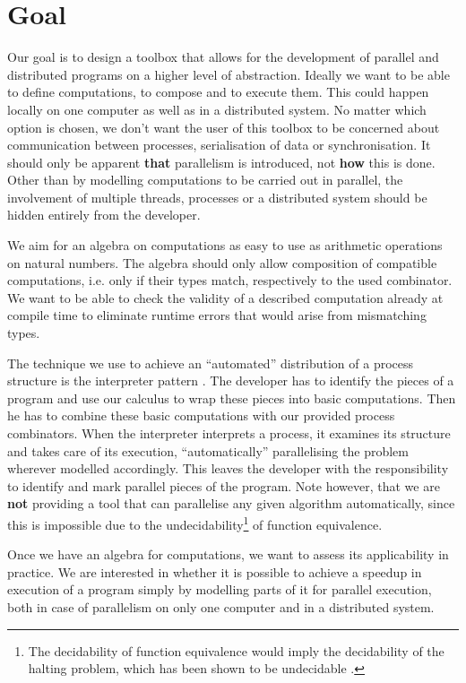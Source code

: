 \section{Goal}
\label{chp:goal}
Our goal is to design a toolbox that allows for the development of parallel and distributed programs on a higher level of abstraction. Ideally we want to be able to define computations, to compose and to execute them. This could happen locally on one computer as well as in a distributed system. No matter which option is chosen, we don't want the user of this toolbox to be concerned about communication between processes, serialisation of data or synchronisation. It should only be apparent \textbf{that} parallelism is introduced, not \textbf{how} this is done. Other than by modelling computations to be carried out in parallel, the involvement of multiple threads, processes or a distributed system should be hidden entirely from the developer.

We aim for an algebra on computations as easy to use as arithmetic operations on natural numbers. The algebra should only allow composition of compatible computations, i.e. only if their types match, respectively to the used combinator. We want to be able to check the validity of a described computation already at compile time to eliminate runtime errors that would arise from mismatching types.

The technique we use to achieve an \enquote{automated} distribution of a process structure is the interpreter pattern \cite{Gamma:1995:DPE:186897}. The developer has to identify the pieces of a program and use our calculus to wrap these pieces into basic computations. Then he has to combine these basic computations with our provided process combinators. When the interpreter interprets a process, it examines its structure and takes care of its execution, \enquote{automatically} parallelising the problem wherever modelled accordingly. This leaves the developer with the responsibility to identify and mark parallel pieces of the program. Note however, that we are \textbf{not} providing a tool that can parallelise any given algorithm automatically, since this is impossible due to the undecidability\footnote{The decidability of function equivalence would imply the decidability of the halting problem, which has been shown to be undecidable \citep{Garey:1979:CIG:578533}.} of function equivalence.

Once we have an algebra for computations, we want to assess its applicability in practice. We are interested in whether it is possible to achieve a speedup in execution of a program simply by modelling parts of it for parallel execution, both in case of parallelism on only one computer and in a distributed system.


